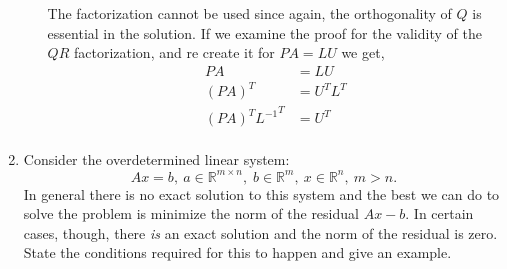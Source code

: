 \documentclass{article}
\newcommand{\rdim}[2]{\mathbb{R}^{#1 \times #2}}
\begin{document}
\begin{enumerate}
\begin{enumerate}
      The factorization cannot be used since again, the orthogonality of $Q$ is essential in the solution. If we examine the proof for the validity of the $QR$ factorization, and re create it for $PA = LU$ we get, 
      \begin{align*}
        PA &= LU \\
        (PA)^T &= U^TL^T \\
        (PA)^T {L^{-1}}^T &= U^T \\
      \end{align*}
  \end{enumerate}
  \item Consider the overdetermined linear system:
  \[ Ax = b,\: a \in \rdim{m}{n}, \; b \in \mathbb{R}^m,\: x \in \mathbb{R}^n, \: m > n.\]
  In general there is no exact solution to this system and the best we can do to solve the problem is minimize the norm of the residual $Ax -b$. In certain cases, though, there \textit{is} an exact solution and the norm of the residual is zero. State the conditions required for this to happen and give an example.
  

\end{enumerate}
\end{document}
